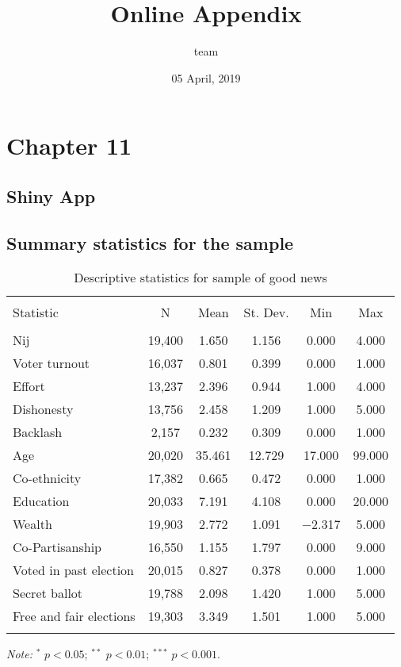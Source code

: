 \documentclass[]{article}
\title{Online Appendix}
\author{team}
\date{05 April, 2019}
\begin{document}
\maketitle

{
\setcounter{tocdepth}{3}
\tableofcontents
}
\section{Chapter 11}\label{chapter-11}

\subsection{Shiny App}\label{shiny-app}

\subsection{Summary statistics for the
sample}\label{summary-statistics-for-the-sample}

\begin{table}[htb] \centering 
  \caption{Descriptive statistics for sample of good news} 
  \label{} 
\begin{tabular}{@{\extracolsep{1pt}}lccccc} 
\\[-1.8ex]\hline 
\hline \\[-1.8ex] 
Statistic & \multicolumn{1}{c}{N} & \multicolumn{1}{c}{Mean} & \multicolumn{1}{c}{St. Dev.} & \multicolumn{1}{c}{Min} & \multicolumn{1}{c}{Max} \\ 
\hline \\[-1.8ex] 
Nij & 19,400 & 1.650 & 1.156 & 0.000 & 4.000 \\ 
Voter turnout & 16,037 & 0.801 & 0.399 & 0.000 & 1.000 \\ 
Effort & 13,237 & 2.396 & 0.944 & 1.000 & 4.000 \\ 
Dishonesty & 13,756 & 2.458 & 1.209 & 1.000 & 5.000 \\ 
Backlash & 2,157 & 0.232 & 0.309 & 0.000 & 1.000 \\ 
Age & 20,020 & 35.461 & 12.729 & 17.000 & 99.000 \\ 
Co-ethnicity & 17,382 & 0.665 & 0.472 & 0.000 & 1.000 \\ 
Education & 20,033 & 7.191 & 4.108 & 0.000 & 20.000 \\ 
Wealth & 19,903 & 2.772 & 1.091 & $-$2.317 & 5.000 \\ 
Co-Partisanship & 16,550 & 1.155 & 1.797 & 0.000 & 9.000 \\ 
Voted in past election & 20,015 & 0.827 & 0.378 & 0.000 & 1.000 \\ 
Secret ballot & 19,788 & 2.098 & 1.420 & 1.000 & 5.000 \\ 
Free and fair elections & 19,303 & 3.349 & 1.501 & 1.000 & 5.000 \\ 
\hline \\[-1.8ex] 
\end{tabular} 
\begin{flushleft}\textit{Note:}  $^*$ $p<0.05$; $^{**}$ $p<0.01$; $^{***}$ $p<0.001$. \end{flushleft}
\end{table}
\end{document}
